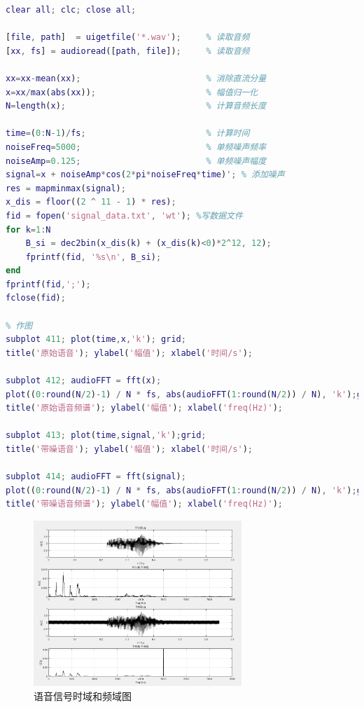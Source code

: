 \documentclass{article}
\begin{document}
\begin{lstlisting}[language=Matlab, caption={语音信号文件处理}]
clear all; clc; close all;

[file, path]  = uigetfile('*.wav');     % 读取音频
[xx, fs] = audioread([path, file]);     % 读取音频

xx=xx-mean(xx);                         % 消除直流分量
x=xx/max(abs(xx));                      % 幅值归一化
N=length(x);                            % 计算音频长度

time=(0:N-1)/fs;                        % 计算时间
noiseFreq=5000;                         % 单频噪声频率
noiseAmp=0.125;                         % 单频噪声幅度
signal=x + noiseAmp*cos(2*pi*noiseFreq*time)'; % 添加噪声
res = mapminmax(signal);
x_dis = floor((2 ^ 11 - 1) * res);
fid = fopen('signal_data.txt', 'wt'); %写数据文件
for k=1:N
    B_si = dec2bin(x_dis(k) + (x_dis(k)<0)*2^12, 12);
    fprintf(fid, '%s\n', B_si);
end
fprintf(fid,';'); 
fclose(fid);

% 作图
subplot 411; plot(time,x,'k'); grid;
title('原始语音'); ylabel('幅值'); xlabel('时间/s');

subplot 412; audioFFT = fft(x);
plot((0:round(N/2)-1) / N * fs, abs(audioFFT(1:round(N/2)) / N), 'k');grid;
title('原始语音频谱'); ylabel('幅值'); xlabel('freq(Hz)');

subplot 413; plot(time,signal,'k');grid;
title('带噪语音'); ylabel('幅值'); xlabel('时间/s');

subplot 414; audioFFT = fft(signal);
plot((0:round(N/2)-1) / N * fs, abs(audioFFT(1:round(N/2)) / N), 'k');grid;
title('带噪语音频谱'); ylabel('幅值'); xlabel('freq(Hz)');    
\end{lstlisting}
\begin{figure}[H]
    \centering
    \includegraphics[width=0.7\textwidth]{image/2024-06-26-21-34-18.png}
    \caption{语音信号时域和频域图}
    \label{image_design_improve_1}
\end{figure}
\end{document}
